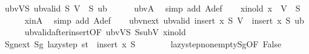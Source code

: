 \begin{isabellebody}
\ ubvVS{\isacharcolon}{\kern0pt}\ {\isachardoublequoteopen}ub{\isacharunderscore}{\kern0pt}valid\ {\isacharquery}{\kern0pt}S\ {\isacharparenleft}{\kern0pt}V\ {\isacharminus}{\kern0pt}\ {\isacharquery}{\kern0pt}S{\isacharparenright}{\kern0pt}\ {\isacharquery}{\kern0pt}ub{\isacharprime}{\kern0pt}{\isachardoublequoteclose}\isanewline
\ \ \ \ \isamarkupfalse%
\ ubvA{\isacharprime}{\kern0pt}\ \isamarkupfalse%
\ {\isacharparenleft}{\kern0pt}simp\ add{\isacharcolon}{\kern0pt}\ A{\isacharunderscore}{\kern0pt}def{\isacharparenright}{\kern0pt}\isanewline
\isanewline
\ \ \isamarkupfalse%
\ x{\isacharunderscore}{\kern0pt}in{\isacharunderscore}{\kern0pt}old{\isacharcolon}{\kern0pt}\ {\isachardoublequoteopen}{\isacharquery}{\kern0pt}x\ {\isasymin}\ V\ {\isacharminus}{\kern0pt}\ {\isacharquery}{\kern0pt}S{\isachardoublequoteclose}\isanewline
\ \ \ \ \isamarkupfalse%
\ x{\isacharunderscore}{\kern0pt}inA\ \isamarkupfalse%
\ {\isacharparenleft}{\kern0pt}simp\ add{\isacharcolon}{\kern0pt}\ A{\isacharunderscore}{\kern0pt}def{\isacharparenright}{\kern0pt}\isanewline
\isanewline
\ \ \isamarkupfalse%
\ ubv{\isacharunderscore}{\kern0pt}next{\isacharcolon}{\kern0pt}\ {\isachardoublequoteopen}ub{\isacharunderscore}{\kern0pt}valid\ {\isacharparenleft}{\kern0pt}insert\ {\isacharquery}{\kern0pt}x\ {\isacharquery}{\kern0pt}S{\isacharparenright}{\kern0pt}\ {\isacharparenleft}{\kern0pt}V\ {\isacharminus}{\kern0pt}\ insert\ {\isacharquery}{\kern0pt}x\ {\isacharquery}{\kern0pt}S{\isacharparenright}{\kern0pt}\ {\isacharquery}{\kern0pt}ub{\isacharprime}{\kern0pt}{\isachardoublequoteclose}\isanewline
\ \ \ \ \isamarkupfalse%
\ ub{\isacharunderscore}{\kern0pt}valid{\isacharunderscore}{\kern0pt}after{\isacharunderscore}{\kern0pt}insert{\isacharbrackleft}{\kern0pt}OF\ ubvVS\ SsubV\ x{\isacharunderscore}{\kern0pt}in{\isacharunderscore}{\kern0pt}old{\isacharbrackright}{\kern0pt}\ \isakeywordONE{{\isachardot}{\kern0pt}}\isamarkupfalse%
\isanewline
\isanewline
\ \ \ \ \isamarkupfalse%
\ Sg{\isacharunderscore}{\kern0pt}next{\isacharcolon}{\kern0pt}\ {\isachardoublequoteopen}Sg\ {\isacharparenleft}{\kern0pt}lazy{\isacharunderscore}{\kern0pt}step\ {\isacharquery}{\kern0pt}st{\isacharparenright}{\kern0pt}\ {\isacharequal}{\kern0pt}\ insert\ {\isacharquery}{\kern0pt}x\ {\isacharquery}{\kern0pt}S{\isachardoublequoteclose}\isanewline
\ \ \ \ \ \ \isamarkupfalse%
\ lazy{\isacharunderscore}{\kern0pt}step{\isacharunderscore}{\kern0pt}nonempty{\isacharunderscore}{\kern0pt}Sg{\isacharbrackleft}{\kern0pt}OF\ False{\isacharbrackright}{\kern0pt}\ \isamarkupfalse%

\end{isabellebody}
